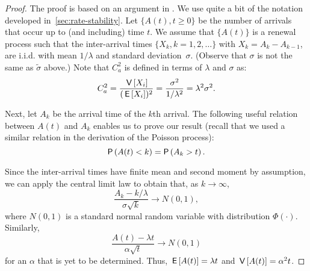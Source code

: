 \begin{proof}
 The proof is based on an argument in \cite{cox62:_renew_theor}.
 We use quite a bit of the notation developed in~\cref{sec:rate-stability}.
 Let $\{A(t), t\geq 0\}$ be the number of arrivals that occur up to (and including) time $t$.
 We assume that $\{A(t)\}$ is a renewal process such that the inter-arrival times $\{X_k, k=1, 2, \ldots\}$ with $X_k = A_{k}-A_{k-1}$, are i.i.d.
 with mean $1/\lambda$ and standard deviation~$\sigma$.
 (Observe that $\sigma$ is not the same as $\tilde \sigma$ above.)
 Note that $C_a^2$ is defined in terms of $\lambda$ and $\sigma$ as:
\begin{equation*}
C_a^2 = \frac{\,\mathsf{V}\left[X_i\right]}{(\,\mathsf{E}\left[X_i\right])^2} = \frac{\sigma^2}{1/\lambda^2} = \lambda^2 \sigma^2.
\end{equation*}

Next, let $A_k$ be the arrival time of the $k$th arrival.
The following useful relation between $A(t)$ and $A_k$ enables us to prove our result (recall that we used a similar relation in the derivation of the Poisson process):
\begin{equation*}
\P{A(t) < k} = \P{A_k > t}.
\end{equation*}

Since the inter-arrival times have finite mean and second moment by assumption, we can apply the central limit law to obtain that, as $k\to\infty$,
\begin{equation*}
\frac{A_k -k/\lambda}{\sigma \sqrt k} \to N(0,1),
\end{equation*}
where $N(0,1)$ is a standard normal random variable with
distribution $\Phi(\cdot)$. Similarly,
%
\begin{equation*}
\frac{A(t) -\lambda t}{\alpha \sqrt t} \to N(0,1)
\end{equation*}
for an $\alpha$ that is yet to be determined. Thus,
$\,\mathsf{E}\left[A(t)\right] = \lambda t$ and $\,\mathsf{V}\left[A(t)\right]=\alpha^2 t$.


\end{proof}
